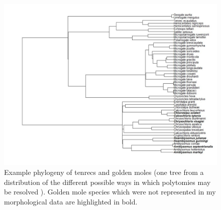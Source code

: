  
\begin{landscape}
\begin{figure}[h] 
  \centering
  \includegraphics[width=\textwidth, height=\textheight, keepaspectratio=true]{Appendix/tc+gm_phylo.jpg}
    \caption[Example phylogeny of tenrecs and golden moles]
    {Example phylogeny of tenrecs and golden moles (one tree from a distribution of the different possible ways in which polytomies may be resolved \citep{Kuhn2011}). Golden mole species which were not represented in my morphological data are highlighted in bold. }
  \label{fig:phylo}
  \end{figure}
 \end{landscape}